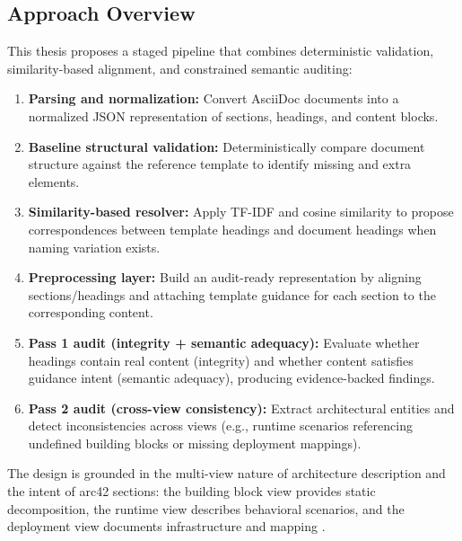 \subsection{Approach Overview}
This thesis proposes a staged pipeline that combines deterministic validation, similarity-based alignment, and constrained semantic auditing:
\begin{enumerate}
    \item \textbf{Parsing and normalization:} Convert AsciiDoc documents into a normalized JSON representation of sections, headings, and content blocks.
    \item \textbf{Baseline structural validation:} Deterministically compare document structure against the reference template to identify missing and extra elements.
    \item \textbf{Similarity-based resolver:} Apply TF-IDF and cosine similarity to propose correspondences between template headings and document headings when naming variation exists.
    \item \textbf{Preprocessing layer:} Build an audit-ready representation by aligning sections/headings and attaching template guidance for each section to the corresponding content.
    \item \textbf{Pass 1 audit (integrity + semantic adequacy):} Evaluate whether headings contain real content (integrity) and whether content satisfies guidance intent (semantic adequacy), producing evidence-backed findings.
    \item \textbf{Pass 2 audit (cross-view consistency):} Extract architectural entities and detect inconsistencies across views (e.g., runtime scenarios referencing undefined building blocks or missing deployment mappings).
\end{enumerate}

The design is grounded in the multi-view nature of architecture description and the intent of arc42 sections: the building block view provides static decomposition, the runtime view describes behavioral scenarios, and the deployment view documents infrastructure and mapping \cite{arc42}.

